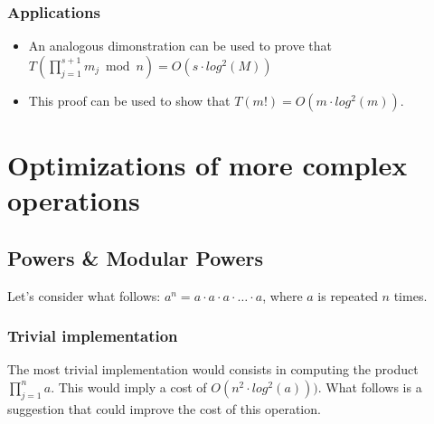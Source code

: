 \subsubsection{Applications}
\begin{itemize}
    \item An analogous dimonstration can be used to prove that $T(\prod_{j = 1}^{s+1} m_{j} \bmod n) = O(s \cdot log^{2}(M))$
    \item This proof can be used to show that $T(m!) = O(m \cdot log^{2}(m))$.
\end{itemize}

\section{Optimizations of more complex operations}
\subsection{Powers \& Modular Powers}
Let's consider what follows: $a^n = a \cdot a \cdot a \cdot \dots \cdot a$, where $a$ is repeated $n$ times.
\subsubsection{Trivial implementation}
The most trivial implementation would consists in computing the product $\prod_{j = 1}^{n} a$. This would imply a cost of $O(n^{2} \cdot log^{2}(a)))$.\newline
What follows is a suggestion that could improve the cost of this operation.
